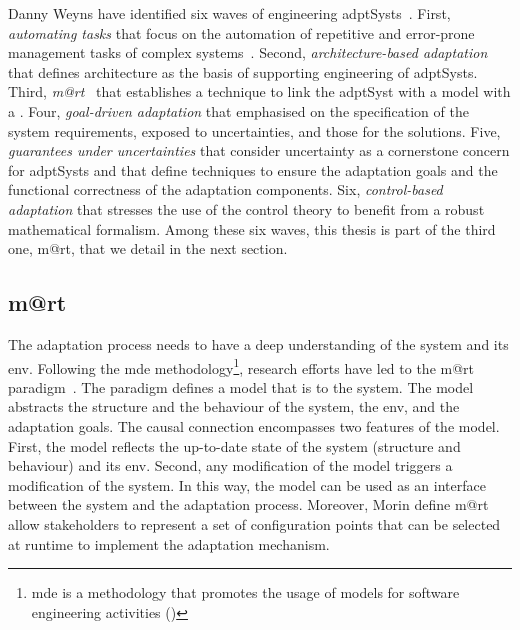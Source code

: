 Danny Weyns have identified six waves of engineering \glspl{adptSyst}~\cite{DBLP:books/sp/19/Weyns19}.
First, \textit{automating tasks} that focus on the automation of repetitive and error-prone management tasks of complex systems~\cite{DBLP:journals/computer/KephartC03}.
Second, \textit{architecture-based adaptation} that defines architecture as the basis of supporting engineering of \glspl{adptSyst}. 
Third, \textit{\gls{m@rt}}~\cite{DBLP:journals/computer/BlairBF09, DBLP:journals/computer/MorinBJFS09} that establishes a technique to link the \gls{adptSyst} with a model with a .
Four, \textit{goal-driven adaptation} that emphasised on the specification of the system requirements, exposed to uncertainties, and those for the solutions.
Five, \textit{guarantees under uncertainties} that consider uncertainty as a cornerstone concern for \glspl{adptSyst} and that define techniques to ensure the adaptation goals and the functional correctness of the adaptation components.
Six, \textit{control-based adaptation} that stresses the use of the control theory to benefit from a robust mathematical formalism.
Among these six waves, this thesis is part of the third one, \gls{m@rt}, that we detail in the next section.
\vfill

\subsection[Models@run.time]{\Gls{m@rt}}
The adaptation process needs to have a deep understanding of the system and its \gls{env}.
Following the \gls{mde} methodology\footnote{\gls{mde} is a methodology that promotes the usage of \glspl{model} for software engineering activities (\cf {})}, research efforts have led to the \gls{m@rt} paradigm~\cite{DBLP:journals/computer/MorinBJFS09, DBLP:journals/computer/BlairBF09}.
The paradigm defines a \gls{model} that is  to the system.
The \gls{model} abstracts the structure and the behaviour of the system, the \gls{env}, and the adaptation goals.
The causal connection encompasses two features of the \gls{model}.
First, the model reflects the up-to-date state of the system (structure and behaviour) and its \gls{env}.
Second, any modification of the model triggers a modification of the system.
In this way, the \gls{model} can be used as an interface between the system and the adaptation process.
Moreover, Morin \etal \cite{DBLP:journals/computer/MorinBJFS09} define \gls{m@rt} allow stakeholders to represent a set of configuration points that can be selected at runtime to implement the adaptation mechanism.

